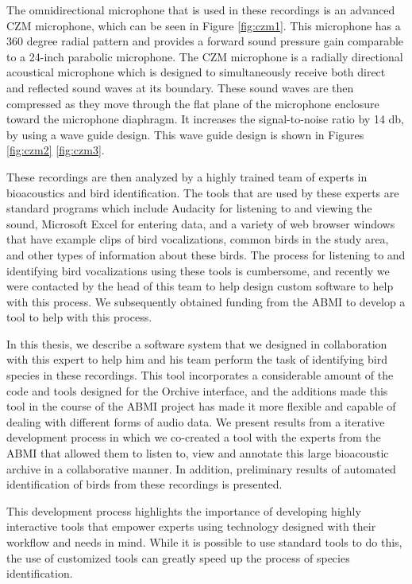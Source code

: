 \documentclass[12pt,oneside]{book}
\begin{document}
The omnidirectional microphone that is used in these recordings is an
advanced CZM microphone, which can be seen in Figure \ref{fig:czm1}.
This microphone has a 360 degree radial pattern and provides a forward
sound pressure gain comparable to a 24-inch parabolic microphone.  The
CZM microphone is a radially directional acoustical microphone which
is designed to simultaneously receive both direct and reflected sound
waves at its boundary.  These sound waves are then compressed as they
move through the flat plane of the microphone enclosure toward the
microphone diaphragm.  It increases the signal-to-noise ratio by 14
db, by using a wave guide design.  This wave guide design is shown in
Figures \ref{fig:czm2} \ref{fig:czm3}.

These recordings are then analyzed by a highly trained team of experts
in bioacoustics and bird identification.  The tools that are used by
these experts are standard programs which include Audacity
\cite{audacity} for listening to and viewing the sound, Microsoft
Excel for entering data, and a variety of web browser windows that
have example clips of bird vocalizations, common birds in the study
area, and other types of information about these birds.  The process
for listening to and identifying bird vocalizations using these tools
is cumbersome, and recently we were contacted by the head of this team
to help design custom software to help with this process.  We
subsequently obtained funding from the ABMI to develop a tool to help
with this process.

In this thesis, we describe a software system that we designed in
collaboration with this expert to help him and his team perform the
task of identifying bird species in these recordings.  This tool
incorporates a considerable amount of the code and tools designed for
the Orchive interface, and the additions made this tool in the course
of the ABMI project has made it more flexible and capable of dealing
with different forms of audio data.  We present results from a
iterative development process in which we co-created a tool with the
experts from the ABMI that allowed them to listen to, view and
annotate this large bioacoustic archive in a collaborative manner.  In
addition, preliminary results of automated identification of birds
from these recordings is presented.

This development process highlights the importance of developing
highly interactive tools that empower experts using technology
designed with their workflow and needs in mind.  While it is possible
to use standard tools to do this, the use of customized tools can
greatly speed up the process of species identification. 
\end{document}

